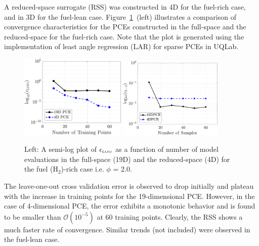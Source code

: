 A reduced-space surrogate (RSS) was constructed in 4D for the fuel-rich case,
and in 3D for
the fuel-lean case. Figure~\ref{fig:err_samples_kinetics}~(left) illustrates a
comparison of convergence characteristics for the PCEs constructed in the
full-space and the reduced-space for the fuel-rich case. Note that the
plot is generated using the implementation of least angle regression (LAR)
for sparse PCEs in UQLab.  
%
\begin{figure}[htbp]
 \begin{center}
  \includegraphics[width=0.45\textwidth]{./Figures/err_samples_kinetics}
   \includegraphics[width=0.44\textwidth]{./Figures/errL2_samples_kinetics}
\caption{Left: A semi-log plot of $\epsilon_\text{\tiny LOO}$ as a function of
number of model evaluations in the full-space (19D) and the reduced-space (4D)
for the fuel (H$_2$)-rich case i.e. $\phi$ = 2.0. }
\label{fig:err_samples_kinetics}
\end{center}
\end{figure}
%
The leave-one-out cross validation error is observed to drop initially
and plateau with the increase in training points for the 19-dimensional
PCE. However, in the case of 4-dimensional PCE, the error exhibits a
monotonic behavior and is found to be smaller than $\mathcal{O}(10^{-5})$
at 60 training points. Clearly, the RSS shows a much faster rate of convergence.
Similar trends (not included) were observed in the fuel-lean case. 

